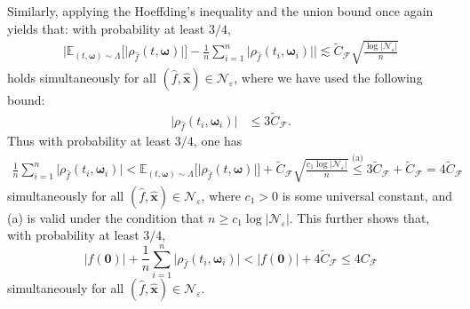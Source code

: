 \documentclass[english]{article}
\begin{document}
Similarly,  applying the Hoeffding's inequality and the union bound once again yields that: with probability at least $3/4$,
%
\begin{align*}
\bigg|\mathbb{E}_{(t, \bm{\omega}) \sim \Lambda}\big[\big|\rho_{\widehat{f}}(t, \bm{\omega})\big|\big] - \frac{1}{n}\sum_{i = 1}^n\big|\rho_{\widehat{f}}(t_i, \bm{\omega}_i)\big|\bigg|
\lesssim \widetilde{C}_{\mathcal{F}}\sqrt{\frac{\log|\mathcal{N}_{\varepsilon}|}{n}}
\end{align*}
%
holds simultaneously for all $(\widehat{f},\widehat{\bm x})\in\mathcal{N}_\varepsilon$,
where we have used the following bound:
%
\begin{align*}
\big|\rho_{\widehat{f}}(t_i, \bm{\omega}_i)\big| &\le 3\widetilde{C}_{\mathcal{F}}.%
\end{align*}
%
Thus with probability at least $3/4$, one has
%
\begin{align*}
\frac{1}{n}\sum_{i = 1}^n\big|\rho_{\widehat{f}}(t_i, \bm{\omega}_i)\big| < \mathbb{E}_{(t, \bm{\omega}) \sim \Lambda}\big[\big|\rho_{\widehat{f}}(t, \bm{\omega})\big|\big] + \widetilde{C}_{\mathcal{F}}\sqrt{\frac{c_1\log|\mathcal{N}_{\varepsilon}|}{n}}
\overset{\text{(a)}}{\le} 3\widetilde{C}_{\mathcal{F}} + \widetilde{C}_{\mathcal{F}} = 4\widetilde{C}_{\mathcal{F}}
\end{align*}
%
simultaneously for all  $(\widehat{f}, \widehat{\bm x}) \in \mathcal{N}_{\varepsilon}$, 
where $c_1>0$ is some universal constant, and (a) is valid under the condition that $n\ge c_1\log |\mathcal{N}_{\varepsilon}|$.
This further shows that, with probability at least $3/4$, 
%
$$
|f({\bm 0})| + \frac{1}{n}\sum_{i = 1}^n\big|\rho_{\widehat{f}}(t_i, \bm{\omega}_i)\big| 
< |f({\bm 0})| + 4\widetilde{C}_\mathcal{F}
\le 4C_\mathcal{F}
$$
simultaneously for all $(\widehat{f},\widehat{\bm{x}})\in \mathcal{N}_{\varepsilon}$. 
\end{document}
